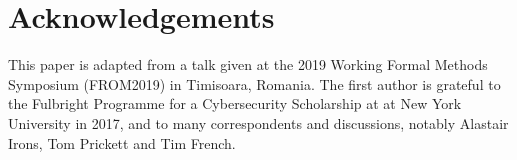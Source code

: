 \documentclass{llncs}
\begin{document}
\section*{Acknowledgements}

This paper is adapted from a talk given at the 2019 Working Formal Methods Symposium (FROM2019) in Timisoara, Romania. The first author is grateful to the Fulbright Programme for a Cybersecurity Scholarship at at New York University in 2017, and to many correspondents and discussions, notably Alastair Irons, Tom Prickett and Tim French.

% 




\end{document}

